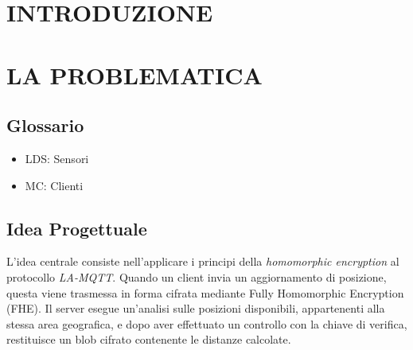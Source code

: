 \documentclass[12pt,a4paper,twoside]{book}
\begin{document}
\chapter{INTRODUZIONE} \label{chap:intro}
\pagestyle{plain}
\setcounter{page}{1}



\chapter{LA PROBLEMATICA}
\section{Glossario}
\begin{itemize}
    \item LDS: Sensori
    \item MC: Clienti
\end{itemize}

\section{Idea Progettuale}
L'idea centrale consiste nell'applicare i principi della \emph{homomorphic encryption} al protocollo \emph{LA-MQTT}. Quando un client invia un aggiornamento di posizione, questa viene trasmessa in forma cifrata mediante Fully Homomorphic Encryption (FHE). Il server esegue un'analisi sulle posizioni disponibili, appartenenti alla stessa area geografica, e dopo aver effettuato un controllo con la chiave di verifica, restituisce un blob cifrato contenente le distanze calcolate.
\end{document}
